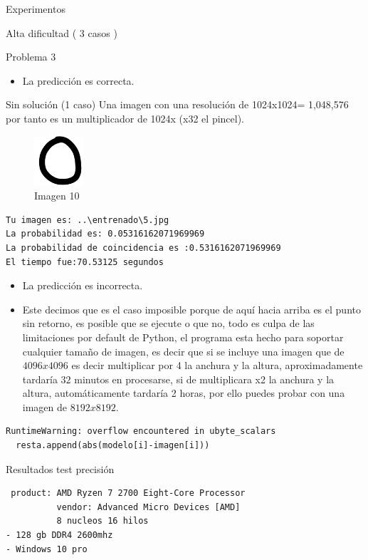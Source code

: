 \documentclass[
  spanish,
  ignorenonframetext,
]{beamer}
\providecommand{\tightlist}{%
  \setlength{\itemsep}{0pt}\setlength{\parskip}{0pt}}
\begin{document}
\begin{frame}[fragile]{Experimentos}
\begin{block}{Alta dificultad ( 3 casos )}
\begin{block}{Problema 3}
\begin{itemize}
\tightlist
\item
  La predicción es correcta.
\end{itemize}
\end{block}
\end{block}

\begin{block}{Sin solución (1 caso)}
\protect\hypertarget{sin-soluciuxf3n-1-caso}{}
Una imagen con una resolución de 1024x1024= 1,048,576 por tanto es un
multiplicador de 1024x (x32 el pincel).

\begin{figure}
\centering
\includegraphics[width=0.72917in,height=\textheight]{documentacion/img/0.png}
\caption{Imagen 10}
\end{figure}

\begin{verbatim}
Tu imagen es: ..\entrenado\5.jpg
La probabilidad es: 0.05316162071969969
La probabilidad de coincidencia es :0.5316162071969969
El tiempo fue:70.53125 segundos
\end{verbatim}

\begin{itemize}
\tightlist
\item
  La predicción es incorrecta.
\item
  Este decimos que es el caso imposible porque de aquí hacia arriba es
  el punto sin retorno, es posible que se ejecute o que no, todo es
  culpa de las limitaciones por default de Python, el programa esta
  hecho para soportar cualquier tamaño de imagen, es decir que si se
  incluye una imagen que de \(4096x4096\) es decir multiplicar por 4 la
  anchura y la altura, aproximadamente tardaría \(32\) minutos en
  procesarse, si de multiplicara x2 la anchura y la altura,
  automáticamente tardaría 2 horas, por ello puedes probar con una
  imagen de \(8192x8192\).
\end{itemize}

\begin{verbatim}
RuntimeWarning: overflow encountered in ubyte_scalars
  resta.append(abs(modelo[i]-imagen[i]))
\end{verbatim}
\end{block}

\begin{block}{Resultados test precisión}
\protect\hypertarget{resultados-test-precisiuxf3n}{}
\begin{verbatim}
 product: AMD Ryzen 7 2700 Eight-Core Processor
          vendor: Advanced Micro Devices [AMD]
          8 nucleos 16 hilos
- 128 gb DDR4 2600mhz
- Windows 10 pro
\end{verbatim}


\end{block}
\end{frame}
\end{document}
